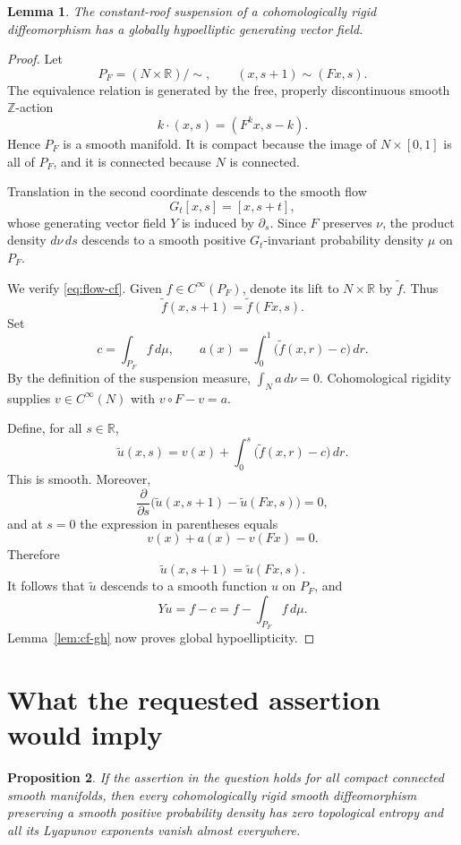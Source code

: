 \documentclass[11pt]{article}
\newtheorem{lemma}{Lemma}
\newtheorem{proposition}[lemma]{Proposition}
\theoremstyle{definition}
\theoremstyle{remark}
\newcommand{\R}{\mathbb{R}}
\begin{document}
\begin{lemma}\label{lem:suspension}
The constant-roof suspension of a cohomologically rigid diffeomorphism
has a globally hypoelliptic generating vector field.
\end{lemma}

\begin{proof}
Let
\[
 P_F=(N\times\R)/{\sim},
 \qquad
 (x,s+1)\sim(Fx,s).
\]
The equivalence relation is generated by the free, properly
discontinuous smooth $\mathbb Z$-action
\[
 k\cdot(x,s)=(F^k x,s-k).
\]
Hence $P_F$ is a smooth manifold. It is compact because the image of
$N\times[0,1]$ is all of $P_F$, and it is connected because $N$ is
connected.

Translation in the second coordinate descends to the smooth flow
\[
 G_t[x,s]=[x,s+t],
\]
whose generating vector field $Y$ is induced by $\partial_s$.
Since $F$ preserves $\nu$, the product density $d\nu\,ds$ descends to
a smooth positive $G_t$-invariant probability density $\mu$ on $P_F$.

We verify \eqref{eq:flow-cf}. Given $f\in C^\infty(P_F)$, denote its
lift to $N\times\R$ by $\widetilde f$. Thus
\[
 \widetilde f(x,s+1)=\widetilde f(Fx,s).
\]
Set
\[
 c=\int_{P_F}f\,d\mu,
 \qquad
 a(x)=\int_0^1\bigl(\widetilde f(x,r)-c\bigr)\,dr.
\]
By the definition of the suspension measure,
$\int_N a\,d\nu=0$. Cohomological rigidity supplies
$v\in C^\infty(N)$ with $v\circ F-v=a$.

Define, for all $s\in\R$,
\[
 \widetilde u(x,s)
 =
 v(x)+\int_0^s\bigl(\widetilde f(x,r)-c\bigr)\,dr.
\]
This is smooth. Moreover,
\[
 \frac{\partial}{\partial s}
 \bigl(\widetilde u(x,s+1)-\widetilde u(Fx,s)\bigr)=0,
\]
and at $s=0$ the expression in parentheses equals
\[
 v(x)+a(x)-v(Fx)=0.
\]
Therefore
\[
 \widetilde u(x,s+1)=\widetilde u(Fx,s).
\]
It follows that $\widetilde u$ descends to a smooth function $u$ on
$P_F$, and
\[
 Yu=f-c=f-\int_{P_F}f\,d\mu.
\]
Lemma~\ref{lem:cf-gh} now proves global hypoellipticity.
\end{proof}

\section{What the requested assertion would imply}

\begin{proposition}\label{prop:reduction}
If the assertion in the question holds for all compact connected smooth
manifolds, then every cohomologically rigid smooth diffeomorphism
preserving a smooth positive probability density has zero topological
entropy and all its Lyapunov exponents vanish almost everywhere.
\end{proposition}
\end{document}
